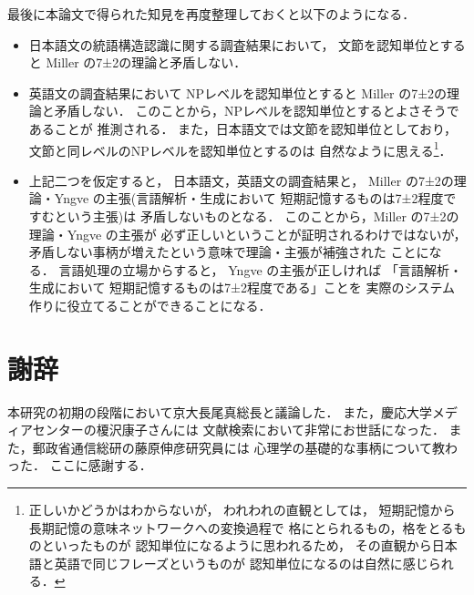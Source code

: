 最後に本論文で得られた知見を再度整理しておくと以下のようになる．
\begin{itemize}
\item 
  日本語文の統語構造認識に関する調査結果において，
  文節を認知単位とすると
  Miller の7±2の理論と矛盾しない．
  
\item 
  英語文の調査結果において
  NPレベルを認知単位とすると
  Miller の7±2の理論と矛盾しない．
  このことから，NPレベルを認知単位とするとよさそうであることが
  推測される．
  また，日本語文では文節を認知単位としており，
  文節と同レベルのNPレベルを認知単位とするのは
  自然なように思える\footnote{正しいかどうかはわからないが，
    われわれの直観としては，
    短期記憶から長期記憶の意味ネットワークへの変換過程で
    格にとられるもの，格をとるものといったものが
    認知単位になるように思われるため，
    その直観から日本語と英語で同じフレーズというものが
    認知単位になるのは自然に感じられる．}．

\item 
  上記二つを仮定すると，
  日本語文，英語文の調査結果と，
  Miller の7±2の理論・Yngve の主張(言語解析・生成において
  短期記憶するものは7±2程度ですむという主張)は
  矛盾しないものとなる．
  このことから，Miller の7±2の理論・Yngve の主張が
  必ず正しいということが証明されるわけではないが，
  矛盾しない事柄が増えたという意味で理論・主張が補強された
  ことになる．
  言語処理の立場からすると，
  Yngve の主張が正しければ
  「言語解析・生成において
  短期記憶するものは7±2程度である」ことを
  実際のシステム作りに役立てることができることになる．
\end{itemize}


\section*{謝辞}

本研究の初期の段階において京大長尾真総長と議論した．
また，慶応大学メディアセンターの榎沢康子さんには
文献検索において非常にお世話になった．
また，郵政省通信総研の藤原伸彦研究員には
心理学の基礎的な事柄について教わった．
ここに感謝する．





